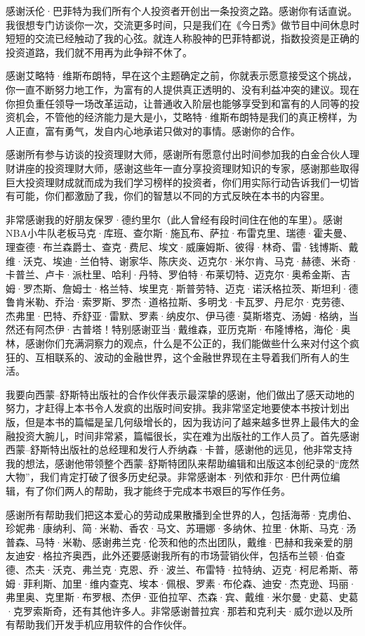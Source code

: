 感谢沃伦·巴菲特为我们所有个人投资者开创出一条投资之路。感谢你有话直说。我很想专门访谈你一次，交流更多时间，只是我们在《今日秀》做节目中间休息时短短的交流已经触动了我的心弦。就连人称股神的巴菲特都说，指数投资是正确的投资道路，我们就不用再为此争辩不休了。

感谢艾略特·维斯布朗特，早在这个主题确定之前，你就表示愿意接受这个挑战，你一直不断努力地工作，为富有的人提供真正透明的、没有利益冲突的建议。现在你担负重任领导一场改革运动，让普通收入阶层也能够享受到和富有的人同等的投资机会，不管他的经济能力是大是小，艾略特·维斯布朗特是我们的真正榜样，为人正直，富有勇气，发自内心地承诺只做对的事情。感谢你的合作。

感谢所有参与访谈的投资理财大师，感谢所有愿意付出时间参加我的白金合伙人理财讲座的投资理财大师，感谢这些年一直分享投资理财知识的专家，感谢那些取得巨大投资理财成就而成为我们学习榜样的投资者，你们用实际行动告诉我们一切皆有可能，你们都激励了我，你们的智慧以不同的方式反映在本书的内容里。

非常感谢我的好朋友保罗·德约里尔（此人曾经有段时间住在他的车里）。感谢NBA小牛队老板马克·库班、查尔斯·施瓦布、萨拉·布雷克里、瑞德·霍夫曼、理查德·布兰森爵士、查克·费尼、埃文·威廉姆斯、彼得·林奇、雷·钱博斯、戴维·沃克、埃迪·兰伯特、谢家华、陈庆炎、迈克尔·米尔肯、马克·赫德、米奇·卡普兰、卢卡·派杜里、哈利·丹特、罗伯特·布莱切特、迈克尔·奥希金斯、吉姆·罗杰斯、詹姆士·格兰特、埃里克·斯普劳特、迈克·诺沃格拉茨、斯坦利·德鲁肯米勒、乔治·索罗斯、罗杰·道格拉斯、多明戈·卡瓦罗、丹尼尔·克劳德、杰弗里·巴特、乔舒亚·雷默、罗素·纳皮尔、伊马德·莫斯塔克、汤姆·格纳，当然还有阿杰伊·古普塔！特别感谢亚当·戴维森，亚历克斯·布隆博格，海伦·奥林，感谢你们充满洞察力的观点，什么是不公正的，我们能做些什么来对付这个疯狂的、互相联系的、波动的金融世界，这个金融世界现在主导着我们所有人的生活。

我要向西蒙–舒斯特出版社的合作伙伴表示最深挚的感谢，他们做出了感天动地的努力，才赶得上本书令人发疯的出版时间安排。我非常坚定地要使本书按计划出版，但是本书的篇幅是呈几何级增长的，因为我访问了越来越多世界上最伟大的金融投资大腕儿，时间非常紧，篇幅很长，实在难为出版社的工作人员了。首先感谢西蒙–舒斯特出版社的总经理和发行人乔纳森·卡普，感谢他的远见，他非常支持我的想法，感谢他带领整个西蒙–舒斯特团队来帮助编辑和出版这本创纪录的“庞然大物”，我们肯定打破了很多历史纪录。非常感谢本·列侬和菲尔·巴什两位编辑，有了你们两人的帮助，我才能终于完成本书艰巨的写作任务。

感谢所有帮助我们把这本爱心的劳动成果散播到全世界的人，包括海蒂·克虏伯、珍妮弗·康纳利、简·米勒、香农·马文、苏珊娜·多纳休、拉里·休斯、马克·汤普森、马特·米勒、感谢弗兰克·伦茨和他的杰出团队，戴维·巴赫和我亲爱的朋友迪安·格拉齐奥西，此外还要感谢我所有的市场营销伙伴，包括布兰顿·伯查德、杰夫·沃克、弗兰克·克恩、乔·波兰、布雷特·拉特纳、迈克·柯尼希斯、蒂姆·菲利斯、加里·维内查克、埃本·佩根、罗素·布伦森、迪安·杰克逊、玛丽·弗里奥、克里斯·布罗根、杰伊·亚伯拉罕、杰森·宾、戴维·米尔曼·史葛、史葛·克罗索斯奇，还有其他许多人。非常感谢普拉宾·那若和克利夫·威尔逊以及所有帮助我们开发手机应用软件的合作伙伴。

